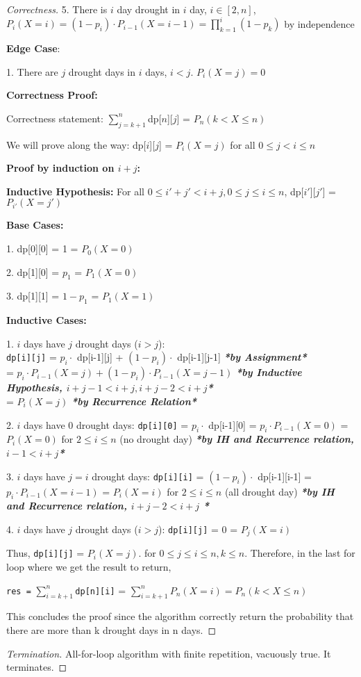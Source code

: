 \documentclass[openany]{article}
\begin{document}
\begin{proof}[Correctness]{}
5. There is $i$ day drought in $i$ day, $i\in[2,n]$,
$P_i(X=i)=(1-p_i)\cdot P_{i-1}(X=i-1) = \prod_{k=1}^{i}(1-p_k)$ by independence
    
\textbf{Edge Case}:

1. There are $j$ drought days in $i$ days, $i<j$. $P_i(X=j) = 0$

\textbf{Correctness Proof:}

Correctness statement: $\sum_{j=k+1}^{n}$dp[$n$][$j$] = $P_n(k<X\leq n)$
  
We will prove along the way: dp[$i$][$j$] = $P_i(X=j)$ for all $ 0 \leq j < i \leq n$

\textbf{Proof by induction on $i+j$:}

\textbf{Inductive Hypothesis:} For all $0 \leq i'+j'<i+j,0 \leq j \leq i \leq n$, dp[$i'$][$j'$] = $P_{i'}(X=j')$

\textbf{Base Cases:}

1. dp[0][0] = 1 = $P_0(X=0)$

2. dp[1][0] = $p_1$ = $P_1(X=0)$

3. dp[1][1] = $1-p_1$ = $P_1(X=1)$

\textbf{Inductive Cases:}

1. $i$ days have $j$ drought days ($i>j$): \\ \texttt{dp[i][j]} = $p_i \cdot$ dp[i-1][j] + $(1-p_i) \cdot$ dp[i-1][j-1] \textbf{\textit{*by Assignment*}} \\= $p_i\cdot P_{i-1}(X=j) + (1-p_i)\cdot P_{i-1}(X=j-1)$ \textbf{\textit{*by Inductive Hypothesis, $i+j-1 < i+j, i+j-2 < i+j$*}}
\\= $P_i(X=j)$ \textbf{\textit{*by Recurrence Relation*}}

2. $i$ days have 0 drought days: \texttt{dp[i][0]} = $p_i \cdot$ dp[i-1][0] =  $p_i\cdot P_{i-1}(X=0)$ = $P_i(X=0)$ for $2\leq i \leq n$ (no drought day) \textbf{\textit{*by IH and Recurrence relation, $i-1 < i+j$*}}

3. $i$ days have $j=i$ drought days: \texttt{dp[i][i]} = $(1-p_i) \cdot$ dp[i-1][i-1]  = $p_i\cdot P_{i-1}(X=i-1)$ =   $P_i(X=i)$ for $2\leq i \leq n$  (all drought day) \textbf{\textit{*by IH and Recurrence relation, $i+j-2 < i+j$ *}}

4. $i$ days have $j$ drought days ($i>j$): \texttt{dp[i][j]} = 0 = $P_j(X=i)$

Thus, \texttt{dp[i][j]} = $P_i(X=j)$. for $0 \leq j \leq i \leq n, k \leq n$. Therefore, in the last for loop where we get the result to return,
\begin{center}
    \texttt{res =} $\sum_{i=k+1}^{n}$\texttt{dp[n][i]} = $\sum_{i=k+1}^{n}P_n(X=i) = P_n(k<X\leq n)$
\end{center}

This concludes the proof since the algorithm correctly return the probability that there are more than k drought days in n days.

\end{proof}
\begin{proof}[Termination]{}
    All-for-loop algorithm with finite repetition, vacuously true. It terminates.
\end{proof}
\end{document}
